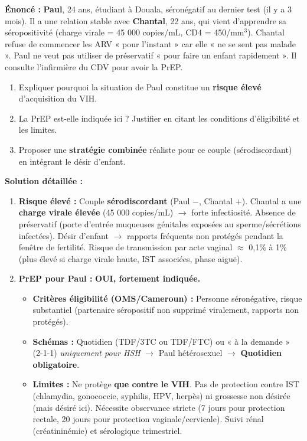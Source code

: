 \documentclass[11pt]{article}
\begin{document}
\begin{exoresolu}
\textbf{Énoncé :} \textbf{Paul}, 24 ans, étudiant à Douala, séronégatif au dernier test (il y a 3 mois). Il a une relation stable avec \textbf{Chantal}, 22 ans, qui vient d'apprendre sa séropositivité (charge virale = 45 000 copies/mL, CD4 = 450/mm$^3$). Chantal refuse de commencer les ARV « pour l'instant » car elle « ne se sent pas malade ». Paul ne veut pas utiliser de préservatif « pour faire un enfant rapidement ». Il consulte l'infirmière du CDV pour avoir la PrEP.
\begin{enumerate}
    \item Expliquer pourquoi la situation de Paul constitue un \textbf{risque élevé} d'acquisition du VIH.
    \item La PrEP est-elle indiquée ici ? Justifier en citant les conditions d'éligibilité et les limites.
    \item Proposer une \textbf{stratégie combinée} réaliste pour ce couple (sérodiscordant) en intégrant le désir d'enfant.
\end{enumerate}
\tcblower
\textbf{Solution détaillée :}
\begin{enumerate}
    \item \textbf{Risque élevé :} Couple \textbf{sérodiscordant} (Paul $-$, Chantal $+$). Chantal a une \textbf{charge virale élevée} (45 000 copies/mL) $\rightarrow$ forte infectiosité. Absence de préservatif (porte d'entrée muqueuses génitales exposées au sperme/sécrétions infectées). Désir d'enfant $\rightarrow$ rapports fréquents non protégés pendant la fenêtre de fertilité. Risque de transmission par acte vaginal $\approx$ 0,1\% à 1\% (plus élevé si charge virale haute, IST associées, phase aiguë).
    \item \textbf{PrEP pour Paul :} \textbf{OUI, fortement indiquée.}
    \begin{itemize}
        \item \textbf{Critères éligibilité (OMS/Cameroun) :} Personne séronégative, risque substantiel (partenaire séropositif non supprimé viralement, rapports non protégés).
        \item \textbf{Schémas :} Quotidien (TDF/3TC ou TDF/FTC) ou « à la demande » (2-1-1) \emph{uniquement pour HSH} $\rightarrow$ Paul hétérosexuel $\rightarrow$ \textbf{Quotidien obligatoire}.
        \item \textbf{Limites :} Ne protège \textbf{que contre le VIH}. Pas de protection contre IST (chlamydia, gonococcie, syphilis, HPV, herpès) ni grossesse non désirée (mais désiré ici). Nécessite observance stricte (7 jours pour protection rectale, 20 jours pour protection vaginale/cervicale). Suivi rénal (créatininémie) et sérologique trimestriel.

\end{itemize}
\end{enumerate}
\end{exoresolu}
\end{document}
